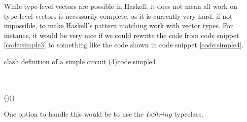 While type-level vectors are possible in Haskell, it does not mean all work on type-level vectors is necessarily complete, as it is currently very hard, if not impossible, to make Haskell's pattern matching work with vector types. 
For instance, it would be very nice if we could rewrite the code from code snippet \ref{code:simple3} to something like the code shown in code snippet \ref{code:simple4}.

\begin{texexptitled}{\gls{clash} definition of a simple circuit (4)}{code:simple4}
\begin{hscode}\SaveRestoreHook
{}%
%
%
\>[B]{}\mathbin{::}\;\;\to {}\<[E]%
\\
\>[B]{}\langle{}\mathbin{:}\mathbin{:}\mathbin{:}\rangle\mathrel{=}{}\<[E]%
\\
\>[B]{}\<[5]%
\>[5]{}\mathbin{\$}\;(\;\;)\;(\;\;){}\<[E]%
\ColumnHook
\end{hscode}\resethooks
\end{texexptitled}

One option to handle this would be to use the $IsString$ typeclass.

